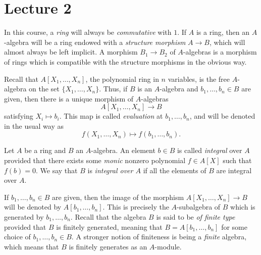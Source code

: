 \section{Lecture 2}

In this course, a \emph{ring} will always be \emph{commutative} with $1$.
If $A$ is a ring, then an $A$-algebra will be a ring endowed with a \emph{structure morphism} $A \to B$, which will almost always be left implicit.
A morphism $B_{1} \to B_{2}$ of $A$-algebras is a morphism of rings which is compatible with the structure morphisms in the obvious way.

Recall that $A[X_{1},\ldots,X_{n}]$, the polynomial ring in $n$ variables, is the free $A$-algebra on the set $\{X_{1},\ldots,X_{n}\}$.
Thus, if $B$ is an $A$-algebra and $b_{1},\ldots,b_{n} \in B$ are given, then there is a unique morphism of $A$-algebras
\[ A[X_{1},\ldots,X_{n}] \to B \]
satisfying $X_{i} \mapsto b_{i}$.
This map is called \emph{evaluation} at $b_{1},\ldots,b_{n}$, and will be denoted in the usual way as
\[ f(X_{1},\ldots,X_{n}) \mapsto f(b_{1},\ldots,b_{n}). \]


\begin{definition}
  Let $A$ be a ring and $B$ an $A$-algebra.
  An element $b \in B$ is called \emph{integral} over $A$ provided that there exists some \emph{monic} nonzero polynomial $f \in A[X]$ such that $f(b) = 0$.
  We say that $B$ is \emph{integral over $A$} if all the elements of $B$ are integral over $A$.
\end{definition}

If $b_{1},\ldots,b_{n} \in B$ are given, then the image of the morphism $A[X_{1},\ldots,X_{n}] \to B$ will be denoted by $A[b_{1},\ldots,b_{n}]$.
This is precisely the $A$-subalgebra of $B$ which is generated by $b_{1},\ldots,b_{n}$.
Recall that the algebra $B$ is said to be \emph{of finite type} provided that $B$ is finitely generated, meaning that $B = A[b_{1},\ldots,b_{n}]$ for some choice of $b_{1},\ldots,b_{n} \in B$.
A stronger notion of finiteness is being a \emph{finite} algebra, which means that $B$ is finitely generates as an $A$-module.

